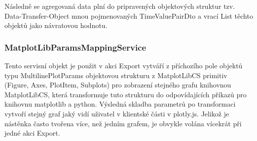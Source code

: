 \documentclass[FM,BP]{tulthesis}
\begin{document}
            Následně se agregovaná data plní do pripravených objektových struktur tzv. Data-Transfer-Object mnou pojmenovaných TimeValuePairDto 
            a vrací List těchto objektů jako návratovou hodnotu. 

        \subsubsection{MatplotLibParamsMappingService}
            Tento servisní objekt je použit v akci Export vytváří z příchozího pole objektů typu MultilinePlotParams objektovou strukturu z 
            MatplotLibCS primitiv (Figure, Axes, PlotItem, Subplots) pro zobrazení stejného grafu knihovnou MatplotLibCS, která transformuje tuto strukturu
            do odpovídajících příkazů pro knihovnu matplotlib a python.
            Výsledná skladba parametrů po transformaci vytvoří stejný graf jaký vidí uživatel v  klientské části v plotly.js.
            Jelikož je nástěnka často tvořena více, než jedním grafem, je obvykle volána vícekrát při jedné akci Export.
\end{document}
